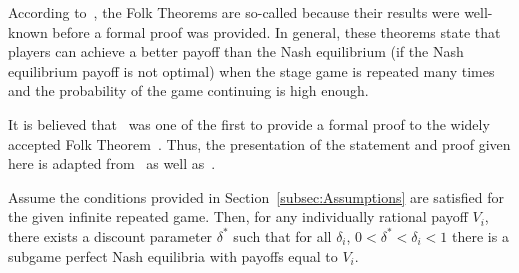 According to~\cite{Webb2007}, the Folk Theorems are
so-called because their results were well-known before a formal proof was
provided. In general, these theorems state that players can achieve a better
payoff than the Nash equilibrium (if the Nash equilibrium payoff is not optimal)
when the stage game is repeated many times and the probability of the game
continuing is high enough. 

It is believed that~\cite{Friedman1971} was one of the
first to provide a formal proof to the widely accepted Folk
Theorem~\cite{Abreu1994, Webb2007}. Thus, the presentation of the statement and
proof given here is adapted from~\cite{Friedman1971} as well as~\cite{Knight2017}.

\begin{theorem}\label{thm:Folk}
    Assume the conditions provided in Section~\ref{subsec:Assumptions} are
    satisfied for the given infinite repeated game. Then, for any individually
    rational payoff \(V_{i}\), there exists a discount parameter \(\delta^{*}\)
    such that for all \(\delta_{i}\), \(0 < \delta^{*} < \delta_{i} < 1\) there
    is a subgame perfect Nash equilibria with payoffs equal to \(V_{i}\).
\end{theorem}


